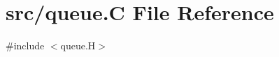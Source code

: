 \hypertarget{queue_8_c}{}\section{src/queue.C File Reference}
\label{queue_8_c}
{\ttfamily \#include $<$queue.\+H$>$}\newline
